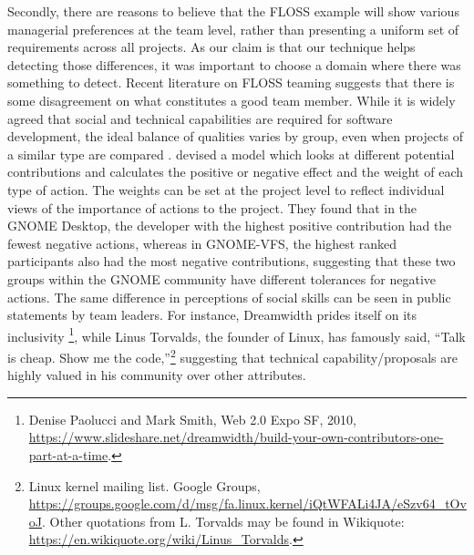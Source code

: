 Secondly, there are reasons to believe that the FLOSS example will show various managerial preferences at the team level, rather than presenting a uniform set of requirements across all projects. As our claim is that our technique helps detecting those differences, it was important to choose a domain where there was something to detect. 
Recent literature on FLOSS teaming suggests that there is some disagreement on what constitutes a good team member. While it is widely agreed that social and technical capabilities are required for software development, the ideal balance of qualities varies by group, even when projects of a similar type are compared \citep{carillo:2016:dose}. \cite{kalliamvakou:2009:measuring} devised a model which looks at different potential contributions and calculates the positive or negative effect and the weight of each type of action. The weights can be set at the project level to reflect individual views of the importance of actions to the project. They found that in the GNOME Desktop, the developer with the highest positive contribution had the fewest negative actions, whereas in GNOME-VFS, the highest ranked participants also had the most negative contributions, suggesting that these two groups within the GNOME community have different tolerances for negative actions. The same difference in perceptions of social skills can be seen in public statements by team leaders. For instance, Dreamwidth prides itself on its inclusivity \footnote{Denise Paolucci and Mark Smith, Web 2.0 Expo SF, 2010, \url{https://www.slideshare.net/dreamwidth/build-your-own-contributors-one-part-at-a-time}.}, while Linus Torvalds, the founder of Linux, has famously said, ``Talk is cheap. Show me the code,''\footnote{Linux kernel mailing list. Google Groups, \url{https://groups.google.com/d/msg/fa.linux.kernel/iQtWFALi4JA/eSzv64_tOvoJ}. Other quotations from L. Torvalds may be found in Wikiquote: \url{https://en.wikiquote.org/wiki/Linus_Torvalds}.} suggesting that technical capability/proposals are highly valued in his community over other attributes. 

